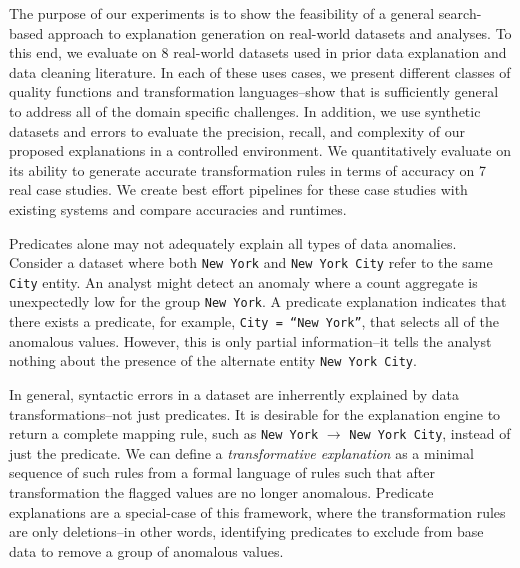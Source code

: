 The purpose of our experiments is to show the feasibility of a general search-based approach to explanation generation on real-world datasets and analyses.  To this end, we evaluate \sys on 8 real-world datasets used in prior data explanation and data cleaning literature. In each of these uses cases, we present different classes of quality functions and transformation languages--show that \sys is sufficiently general to address all of the domain specific challenges. 
In addition, we use synthetic datasets and errors to evaluate the precision, recall, and complexity of our proposed explanations in a controlled environment.  
We quantitatively evaluate \sys on its ability to generate accurate transformation rules in terms of accuracy on 7 real case studies. We create best effort pipelines for these case studies with existing systems and compare accuracies and runtimes.












Predicates alone may not adequately explain all types of data anomalies.
Consider a dataset where both \texttt{New York} and \texttt{New York City} refer to the same \texttt{City} entity.
An analyst might detect an anomaly where a count aggregate is unexpectedly low for the group \texttt{New York}. 
A predicate explanation indicates that there exists a predicate, for example, \texttt{City = ``New York''}, that selects all of the anomalous values. 
However, this is only partial information--it tells the analyst nothing about the presence of the alternate entity \texttt{New York City}. 

In general, syntactic errors in a dataset are inherrently explained by data transformations--not just predicates.
It is desirable for the explanation engine to return a complete mapping rule, such as  \texttt{New York} $\rightarrow$ \texttt{New York City}, instead of just the predicate.
We can define a \emph{transformative explanation} as a minimal sequence of such rules from a formal language of rules such that after transformation the flagged values are no longer anomalous. 
Predicate explanations are a special-case of this framework, where the transformation rules are only deletions--in other words, identifying predicates to exclude from base data to remove a group of anomalous values.

